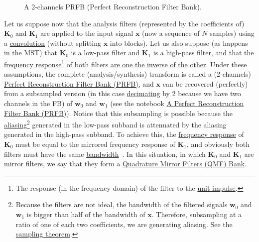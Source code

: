 \begin{figure}
  \centering
  \caption{A 2-channels PRFB (Perfect Reconstruction Filter Bank).}
  \label{fig:PRFB}
\end{figure}

Let us suppose now that the analysis filters (represented by the coefficients of) ${\mathbf K}_0$ and ${\mathbf K}_1$ are applied to the input
signal ${\mathbf x}$ (now a sequence of $N$ samples) using a
\href{https://en.wikipedia.org/wiki/Kernel_(image_processing)}{convolution}
(without splitting $\mathbf{x}$ into blocks). Let us also suppose (as
happens in the MST) that ${\mathbf K}_0$ is a low-pass filter and
${\mathbf K}_1$ is a high-pass filter, and that the
\href{https://en.wikipedia.org/wiki/Filter_(signal_processing)}{frequency
  response}\footnote{The response (in the frequency domain) of the
  filter to the
  \href{https://en.wikipedia.org/?title=Unit_impulse&redirect=no}{unit
    impulse}.} of both filters
\href{https://en.wikipedia.org/wiki/Filter_bank#Perfect_reconstruction_filter_banks}{are
  one the inverse of the other}. Under these assumptions, the complete
(analysis/synthesis) transform is called a (2-channels)
\href{https://en.wikipedia.org/wiki/Filter_bank#Perfect_reconstruction_filter_banks}{Perfect
  Reconstruction Filter Bank (PRFB)}, and ${\mathbf x}$ can be
recovered (perfectly) from a subsampled version (in this case
\href{https://en.wikipedia.org/wiki/Downsampling_(signal_processing)}{decimating}
by 2 because we have two channels in the FB) of ${\mathbf w}_0$ and
${\mathbf w}_1$ (see the notebook
\href{https://github.com/Tecnologias-multimedia/intercom/blob/master/docs/PRFB.ipynb}{A
  Perfect Reconstruction Filter Bank (PRFB)}). Notice that this
subsampling is possible because the
\href{https://en.wikipedia.org/wiki/Aliasing}{aliasing}\footnote{Because
  the filters are not ideal, the bandwidth of the filtered signals
  ${\mathbf w}_0$ and ${\mathbf w}_1$ is bigger than half of the
  bandwidth of ${\mathbf x}$. Therefore, subsampling at a ratio of one
  of each two coefficients, we are generating aliasing. See the
  \href{https://en.wikipedia.org/wiki/Nyquist-Shannon_sampling_theorem}{sampling
    theorem}.}  generated in the low-pass subband is attenuated by the
aliasing generated in the high-pass subband. To achieve this, the
\href{https://en.wikipedia.org/wiki/Filter_(signal_processing)}{frequency
  response} of ${\mathbf K}_0$ must be equal to the mirrored frequency
response of ${\mathbf K}_1$, and obviously both filters must have the
same
\href{https://en.wikipedia.org/wiki/Bandwidth_(signal_processing)}{bandwidth}~\cite{sayood2017introduction}. In
this situation, in which ${\mathbf K}_0$ and ${\mathbf K}_1$ are
mirror filters, we say that they form a
\href{https://en.wikipedia.org/wiki/Quadrature_mirror_filter}{Quadrature
  Mirror Filters (QMF) Bank}.

